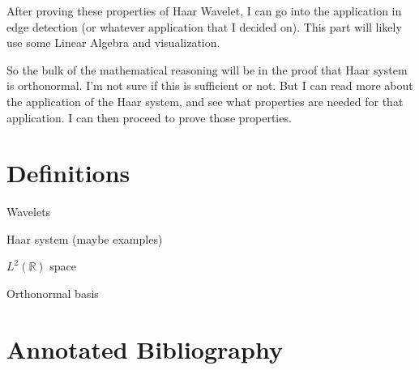 \documentclass[11pt]{amsart}
\theoremstyle{theorem} %
\theoremstyle{definition}                  %
\theoremstyle{example}                       %
\theoremstyle{remark}                       %
\numberwithin{equation}{section}
\newcommand{\R}{\mathbb{R}}
\begin{document}
After proving these properties of Haar Wavelet, I can go into the application in edge detection (or whatever application that I decided on). This part will likely use some Linear Algebra and visualization.

So the bulk of the mathematical reasoning will be in the proof that Haar system is orthonormal. I'm not sure if this is sufficient or not. But I can read more about the application of the Haar system, and see what properties are needed for that application. I can then proceed to prove those properties.

\section{Definitions}

Wavelets

Haar system (maybe examples)

$ L^2(\R) $ space

Orthonormal basis
 
\section{Annotated Bibliography}
\end{document}
